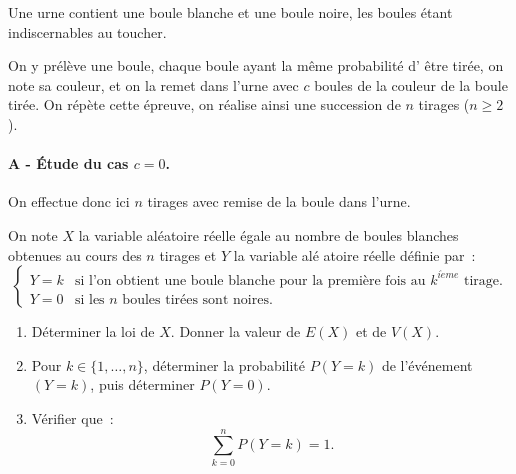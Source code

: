 


\begin{exercice}




Une urne contient une boule blanche et une boule noire, les boules \'etant
indiscernables au toucher.

On y pr\'el\`eve une boule, chaque boule ayant la m\^{e}me probabilit\'e d'%
\^{e}tre tir\'ee, on note sa couleur, et on la remet dans l'urne avec $c$
boules de la couleur de la boule tir\'ee. On r\'ep\`ete cette \'epreuve, on
r\'ealise ainsi une succession de $n$ tirages ($n\geqslant 2$).

\paragraph{\small{A - \'Etude du cas $c=0$.}\\}

On effectue donc ici $n$ tirages avec remise de la boule dans l'urne.

On note $X$ la variable al\'{e}atoire r\'{e}elle \'{e}gale au nombre de
boules blanches obtenues au cours des $n$ tirages et $Y$ la variable al\'{e}%
atoire r\'{e}elle d\'{e}finie par~: 
\begin{equation*}
\begin{cases}
Y=k & \text{si l'on obtient une boule blanche pour la premi\`{e}re fois au }%
k^{i\grave{e}me}\text{ tirage.} \\ 
Y=0 & \text{si les $n$ boules tir\'{e}es sont noires.}%
\end{cases}%
\end{equation*}

\begin{enumerate}
\item D\'{e}terminer la loi de $X$. Donner la valeur de $E(X)$ et de $V(X)$.

\item Pour $k\in \{1,\ldots ,n\}$, d\'{e}terminer la probabilit\'{e} $P(Y=k) 
$ de l'\'{e}v\'{e}nement $(Y=k)$, puis d\'{e}terminer $P(Y=0)$.

\item V\'{e}rifier que~: 
\begin{equation*}
\sum_{k=0}^{n}P(Y=k)=1.
\end{equation*}


\end{enumerate}
\end{exercice}
